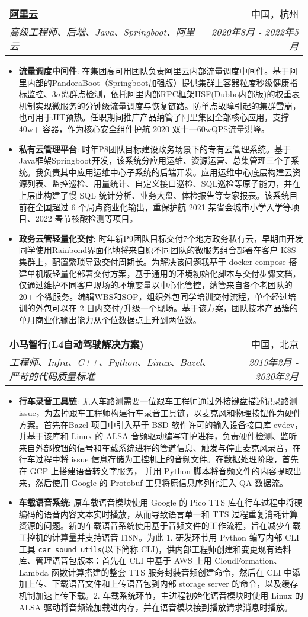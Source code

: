\documentclass[letterpaper,11pt]{article}
\makeatletter
\newcommand{\resumeItem}[2]{
	\item\small{
		\textbf{#1}{: #2 \vspace{-2pt}}
	}
}
\newcommand{\resumeSubheading}[4]{
	\vspace{-1pt}\item
	\begin{tabular*}{0.97\textwidth}[t]{l@{\extracolsep{\fill}}r}
		\textbf{#1} & #2 \\
		\textit{\small#3} & \textit{\small #4} \\
	\end{tabular*}\vspace{-5pt}
}
\newcommand{\resumeItemListStart}{\begin{itemize}}
\newcommand{\resumeItemListEnd}{\end{itemize}\vspace{-5pt}}
\makeatother
\begin{document}
\begin{spacing}{0.9}
		
		\resumeSubheading
		{\href{https://www.aliyun.com/}{阿里云}}{中国，杭州}
		{高级工程师、后端、Java、Springboot、阿里云}{2020年8月 - 2022年5月}
		\resumeItemListStart
		\resumeItem{流量调度中间件}
		{在集团高可用团队负责阿里云内部流量调度中间件。基于阿里内部的PandoraBoot（Springboot加强版）提供集群上容器粒度秒级健康指标监控、$3\sigma$离群点检测，依托阿里内部RPC框架HSF(Dubbo内部版)的权重表机制实现微服务的分钟级流量调度与恢复链路。防单点故障引起的集群雪崩，也可用于JIT预热。任职期间推广产品纳管了阿里集团全部核心应用，支撑 40w+ 容器，作为核心安全组件护航 2020 双十一60wQPS流量洪峰。}
		\resumeItem{私有云管理平台}
		{时年P8团队目标建设政务场景下的专有云管理系统。基于Java框架Springboot开发，该系统分应用运维、资源运营、总集管理三个子系统。我负责其中应用运维中心子系统的后端开发。应用运维中心底层构建云资源列表、监控巡检、用量统计、自定义接口巡检、SQL巡检等原子能力，并在上层此构建了慢 SQL 统计分析、业务大盘、体检报告等专家报表。该系统目前在全国超过 6 个局点商业化输出，重保护航 2021 某省会城市小学入学等项目、2022 春节核酸检测等项目。}
		\resumeItem{政务云管轻量化交付}
		{时年新P9团队目标交付7个地方政务私有云，早期由开发同学使用Rainbond界面化地将来自原不同团队的微服务组合部署在客户 K8S 集群上，配置繁琐导致交付周期长。为解决该问题我基于 docker-compose 搭建单机版轻量化部署交付方案，基于通用的环境初始化脚本与交付步骤文档，仅通过维护不同客户现场的环境变量以中心化管控，纳管来自各个老团队的 20+ 个微服务。编辑WBS和SOP，组织外包同学培训交付流程，单个经过培训的外包可以在 2 日内交付/升级一个现场。基于该方案，团队技术产品簇的单月商业化输出能力从个位数据点上升到两位数。}
		\resumeItemListEnd
		
		\resumeSubheading
		{\href{https://pony.ai/?lang=zh}{小马智行}(L4自动驾驶解决方案)}{中国，北京}
		{工程师、Infra、C++、Python、Linux、Bazel、严苛的代码质量标准}{2019年2月 - 2020年3月}
		\resumeItemListStart
		\resumeItem{行车录音工具链}
		{无人车路测需要一位跟车工程师通过外接键盘描述记录路测 issue，为去掉跟车工程师构建行车录音工具链，以麦克风和物理按钮作为硬件方案。首先在Bazel 项目中引入基于 BSD 软件许可的输入设备接口库 evdev，并基于该库和 Linux 的 ALSA 音频驱动编写守护进程，负责硬件检测、监听来自外部按钮的信号和车载系统进程的管道信息、触发与停止麦克风录音，在行车过程中将 issue 信息存储为工控机上的音频文件。在数据处理阶段，首先在 GCP 上搭建语音转文字服务， 并用 Python 脚本将音频文件的内容提取出来，然后使用 Google 的 Protobuf 工具将原信息序列化汇入 QA 数据流。}
		\resumeItem{车载语音系统}
		{原车载语音模块使用 Google 的 Pico TTS 库在行车过程中将硬编码的语音内容文本实时播放，从而导致语言单一和 TTS 过程重复消耗计算资源的问题。新的车载语音系统使用基于音频文件的工作流程，旨在减少车载工控机的计算量并支持语音 I18N。为此 1. 研发环节用 Python 编写内部 CLI 工具 \texttt{car\_sound\_utils}(以下简称 CLI)，供内部工程师创建和变更现有语料库、管理语音包版本：首先在 CLI 中基于 AWS 上用 CloudFormation、Lambda 函数计算搭建的整套 TTS 服务封装音频创建命令，然后在 CLI 中添加上传、下载语音文件和上传语音包到内部 storage server 的命令，以及缓存机制加速上传下载。2. 车载系统环节，主进程初始化语音模块时使用 Linux 的 ALSA 驱动将音频流加载进内存，并在语音模块接到播放请求消息时播放。}
		\resumeItemListEnd
		

\end{spacing}
\end{document}
